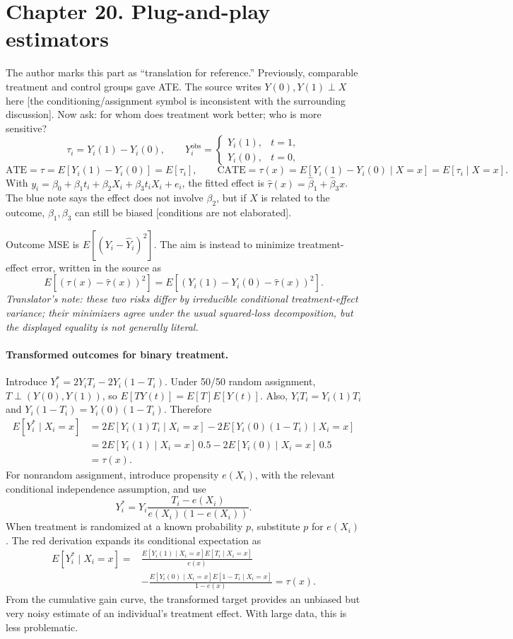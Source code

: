 \section{Chapter 20. Plug-and-play estimators}
The author marks this part as ``translation for reference.'' Previously, comparable treatment and control groups gave ATE. The source writes $Y(0),Y(1)\perp X$ here [the conditioning/assignment symbol is inconsistent with the surrounding discussion]. Now ask: for whom does treatment work better; who is more sensitive?
\[\tau_i=Y_i(1)-Y_i(0),\qquad
Y_i^{\mathrm{obs}}=\begin{cases}Y_i(1),&t=1,\\Y_i(0),&t=0,\end{cases}
\]
\[\mathrm{ATE}=\tau=E[Y_i(1)-Y_i(0)]=E[\tau_i],\qquad
\mathrm{CATE}=\tau(x)=E[Y_i(1)-Y_i(0)\mid X=x]=E[\tau_i\mid X=x].\]
With $y_i=\beta_0+\beta_1t_i+\beta_2X_i+\beta_3t_iX_i+e_i$, the fitted effect is $\hat\tau(x)=\hat\beta_1+\hat\beta_3x$. The blue note says the effect does not involve $\beta_2$, but if $X$ is related to the outcome, $\beta_1,\beta_3$ can still be biased [conditions are not elaborated].

Outcome MSE is $E[(Y_i-\hat Y_i)^2]$. The aim is instead to minimize treatment-effect error, written in the source as
\[E[(\tau(x)-\hat\tau(x))^2]=E[(Y_i(1)-Y_i(0)-\hat\tau(x))^2].\]
\textit{Translator's note: these two risks differ by irreducible conditional treatment-effect variance; their minimizers agree under the usual squared-loss decomposition, but the displayed equality is not generally literal.}

\paragraph{Transformed outcomes for binary treatment.}
Introduce $Y_i^*=2Y_iT_i-2Y_i(1-T_i)$. Under 50/50 random assignment, $T\perp(Y(0),Y(1))$, so $E[TY(t)]=E[T]E[Y(t)]$. Also, $Y_iT_i=Y_i(1)T_i$ and $Y_i(1-T_i)=Y_i(0)(1-T_i)$. Therefore
\begin{align*}
E[Y_i^*\mid X_i=x]
&=2E[Y_i(1)T_i\mid X_i=x]-2E[Y_i(0)(1-T_i)\mid X_i=x]\\
&=2E[Y_i(1)\mid X_i=x]\,0.5-2E[Y_i(0)\mid X_i=x]\,0.5\\
&=\tau(x).
\end{align*}
For nonrandom assignment, introduce propensity $e(X_i)$, with the relevant conditional independence assumption, and use
\[Y_i^*=Y_i\frac{T_i-e(X_i)}{e(X_i)(1-e(X_i))}.\]
When treatment is randomized at a known probability $p$, substitute $p$ for $e(X_i)$. The red derivation expands its conditional expectation as
\begin{align*}
E[Y_i^*\mid X_i=x]
={}&\frac{E[Y_i(1)\mid X_i=x]E[T_i\mid X_i=x]}{e(x)}\\
&-\frac{E[Y_i(0)\mid X_i=x]E[1-T_i\mid X_i=x]}{1-e(x)}=\tau(x).
\end{align*}
From the cumulative gain curve, the transformed target provides an unbiased but very noisy estimate of an individual's treatment effect. With large data, this is less problematic.

